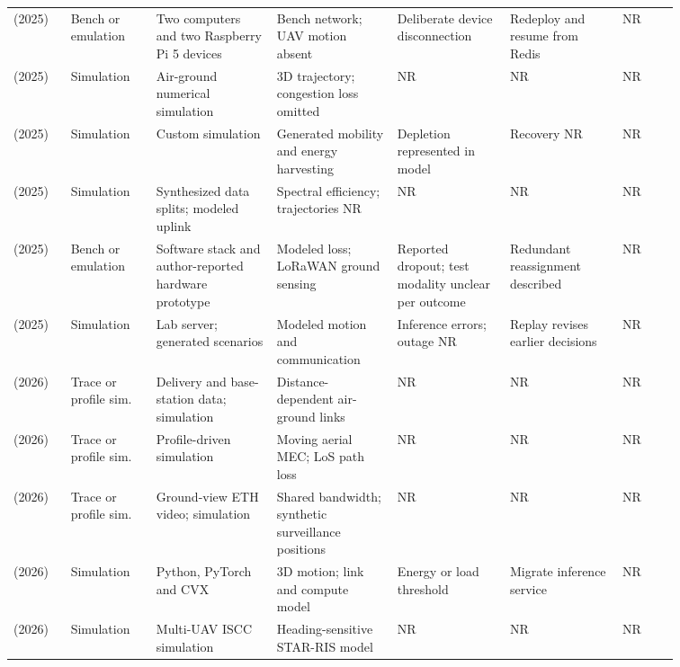 \begin{table}[!tp]
\begin{tabular}{@{}Y{0.0705\linewidth}Y{0.1090\linewidth}Y{0.1598\linewidth}Y{0.1532\linewidth}Y{0.1466\linewidth}Y{0.1438\linewidth}Y{0.0724\linewidth}@{}}
\cite{R0038}\newline\mbox{(2025)} & Bench or emulation & Two computers and two Raspberry Pi 5 devices & Bench network; UAV motion absent & Deliberate device disconnection & Redeploy and resume from Redis & NR \\
\cite{R0064}\newline\mbox{(2025)} & Simulation & Air-ground numerical simulation & 3D trajectory; congestion loss omitted & NR & NR & NR \\
\cite{R0071}\newline\mbox{(2025)} & Simulation & Custom simulation & Generated mobility and energy harvesting & Depletion represented in model & Recovery NR & NR \\
\cite{R0080}\newline\mbox{(2025)} & Simulation & Synthesized data splits; modeled uplink & Spectral efficiency; trajectories NR & NR & NR & NR \\
\cite{R0090}\newline\mbox{(2025)} & Bench or emulation & Software stack and author-reported hardware prototype & Modeled loss; LoRaWAN ground sensing & Reported dropout; test modality unclear per outcome & Redundant reassignment described & NR \\
\cite{R0145}\newline\mbox{(2025)} & Simulation & Lab server; generated scenarios & Modeled motion and communication & Inference errors; outage NR & Replay revises earlier decisions & NR \\
\cite{R0001}\newline\mbox{(2026)} & Trace or profile sim. & Delivery and base-station data; simulation & Distance-dependent air-ground links & NR & NR & NR \\
\cite{R0009}\newline\mbox{(2026)} & Trace or profile sim. & Profile-driven simulation & Moving aerial MEC; LoS path loss & NR & NR & NR \\
\cite{R0036}\newline\mbox{(2026)} & Trace or profile sim. & Ground-view ETH video; simulation & Shared bandwidth; synthetic surveillance positions & NR & NR & NR \\
\cite{R0045}\newline\mbox{(2026)} & Simulation & Python, PyTorch and CVX & 3D motion; link and compute model & Energy or load threshold & Migrate inference service & NR \\
\cite{R0054}\newline\mbox{(2026)} & Simulation & Multi-UAV ISCC simulation & Heading-sensitive STAR-RIS model & NR & NR & NR \\

\end{tabular}
\end{table}
